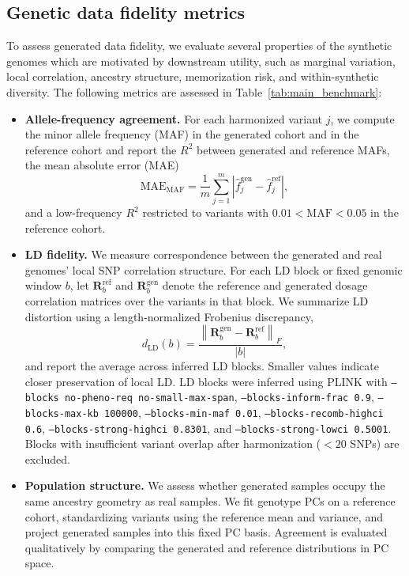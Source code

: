 \documentclass{article}
\begin{document}
\subsection{Genetic data fidelity metrics}
\label{app:benchmark-metric-definitions}

To assess generated data fidelity, we evaluate several properties of the synthetic genomes which are motivated by downstream utility, such as marginal variation, local correlation, ancestry structure, memorization risk, and within-synthetic diversity. The following metrics are assessed in Table~\ref{tab:main_benchmark}:
\begin{itemize}
    \item \textbf{Allele-frequency agreement.}
    For each harmonized variant \(j\), we compute the minor allele frequency (MAF) in the generated cohort and in the reference cohort and report the \(R^2\) between generated and reference MAFs, the mean absolute error (MAE)
    \[
    \mathrm{MAE}_{\mathrm{MAF}}
    =
    \frac{1}{m}\sum_{j=1}^{m}
    \left|
    \widehat f^{\mathrm{gen}}_j-\widehat f^{\mathrm{ref}}_j
    \right|,
    \]
    and a low-frequency \(R^2\) restricted to variants with \(0.01<\mathrm{MAF}<0.05\) in the reference cohort. 
    
    \item \textbf{LD fidelity.}
    We measure correspondence between the generated and real genomes' local SNP correlation structure. For each LD block or fixed genomic window \(b\), let
    \(\boldsymbol R_b^{\mathrm{ref}}\) and \(\boldsymbol R_b^{\mathrm{gen}}\) denote the reference and generated dosage correlation matrices over the variants in that block. We summarize LD distortion using a length-normalized Frobenius discrepancy,
    \[
    d_{\mathrm{LD}}(b)
    =
    \frac{
    \left\|
    \boldsymbol R_b^{\mathrm{gen}}
    -
    \boldsymbol R_b^{\mathrm{ref}}
    \right\|_F
    }{|b|},
    \]
    and report the average across inferred LD blocks. Smaller values indicate closer preservation of local LD. LD blocks were inferred using PLINK with \texttt{---blocks no-pheno-req no-small-max-span}, \texttt{---blocks-inform-frac 0.9}, \texttt{---blocks-max-kb 100000}, \texttt{---blocks-min-maf 0.01}, \texttt{---blocks-recomb-highci 0.6}, \texttt{---blocks-strong-highci 0.8301}, and \texttt{---blocks-strong-lowci 0.5001}. Blocks with insufficient variant overlap after harmonization ($<20$ SNPs) are excluded.

    \item \textbf{Population structure.}
    We assess whether generated samples occupy the same ancestry geometry as real samples. We fit genotype PCs on a reference cohort, standardizing variants using the reference mean and variance, and project generated samples into this fixed PC basis. Agreement is evaluated qualitatively by comparing the generated and reference distributions in PC space. 


\end{itemize}
\end{document}
